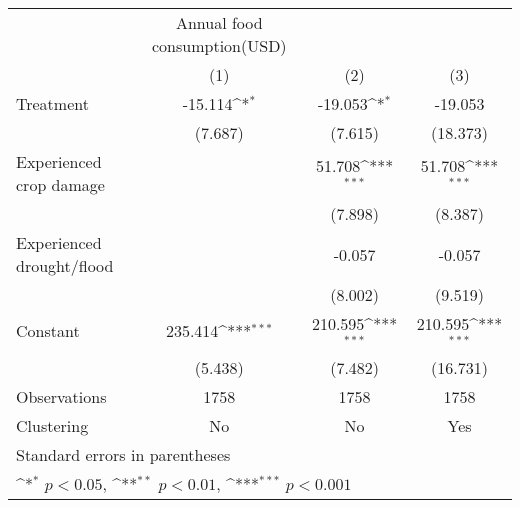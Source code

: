 {
\def\sym#1{\ifmmode^{#1}\else\(^{#1}\)\fi}
\begin{tabular}{l*{3}{c}}
\hline\hline
                    &Annual food consumption(USD)                                     \\
                    &\multicolumn{1}{c}{(1)}         &\multicolumn{1}{c}{(2)}         &\multicolumn{1}{c}{(3)}         \\
\hline
Treatment           &     -15.114\sym{*}  &     -19.053\sym{*}  &     -19.053         \\
                    &     (7.687)         &     (7.615)         &    (18.373)         \\
[1em]
Experienced crop damage&                     &      51.708\sym{***}&      51.708\sym{***}\\
                    &                     &     (7.898)         &     (8.387)         \\
[1em]
Experienced drought/flood&                     &      -0.057         &      -0.057         \\
                    &                     &     (8.002)         &     (9.519)         \\
[1em]
Constant            &     235.414\sym{***}&     210.595\sym{***}&     210.595\sym{***}\\
                    &     (5.438)         &     (7.482)         &    (16.731)         \\
\hline
Observations        &        1758         &        1758         &        1758         \\
Clustering          &          No         &          No         &         Yes         \\
\hline\hline
\multicolumn{4}{l}{\footnotesize Standard errors in parentheses}\\
\multicolumn{4}{l}{\footnotesize \sym{*} \(p<0.05\), \sym{**} \(p<0.01\), \sym{***} \(p<0.001\)}\\
\end{tabular}
}

